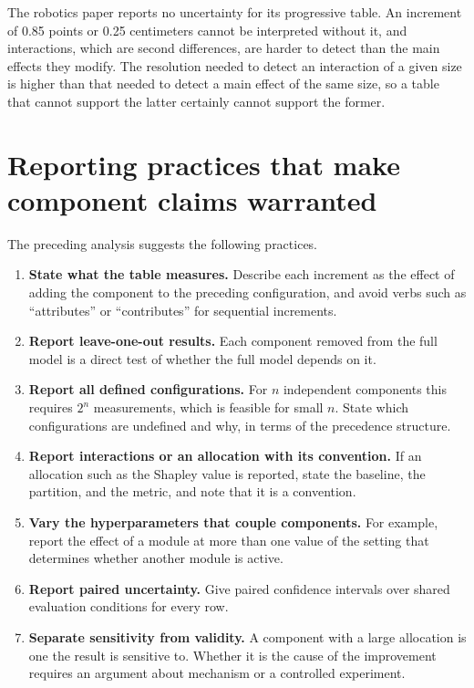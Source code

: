 \documentclass[11pt]{article}
\theoremstyle{plain}
\theoremstyle{remark}
\begin{document}
The robotics paper reports no uncertainty for its progressive table. An increment of 0.85 points or 0.25 centimeters cannot be interpreted without it, and interactions, which are second differences, are harder to detect than the main effects they modify. The resolution needed to detect an interaction of a given size is higher than that needed to detect a main effect of the same size, so a table that cannot support the latter certainly cannot support the former.

\section{Reporting practices that make component claims warranted}\label{sec:report}

The preceding analysis suggests the following practices.
\begin{enumerate}
\item \textbf{State what the table measures.} Describe each increment as the effect of adding the component to the preceding configuration, and avoid verbs such as ``attributes'' or ``contributes'' for sequential increments.
\item \textbf{Report leave-one-out results.} Each component removed from the full model is a direct test of whether the full model depends on it.
\item \textbf{Report all defined configurations.} For $n$ independent components this requires $2^n$ measurements, which is feasible for small $n$. State which configurations are undefined and why, in terms of the precedence structure.
\item \textbf{Report interactions or an allocation with its convention.} If an allocation such as the Shapley value is reported, state the baseline, the partition, and the metric, and note that it is a convention.
\item \textbf{Vary the hyperparameters that couple components.} For example, report the effect of a module at more than one value of the setting that determines whether another module is active.
\item \textbf{Report paired uncertainty.} Give paired confidence intervals over shared evaluation conditions for every row.
\item \textbf{Separate sensitivity from validity.} A component with a large allocation is one the result is sensitive to. Whether it is the cause of the improvement requires an argument about mechanism or a controlled experiment.
\end{enumerate}
\end{document}
